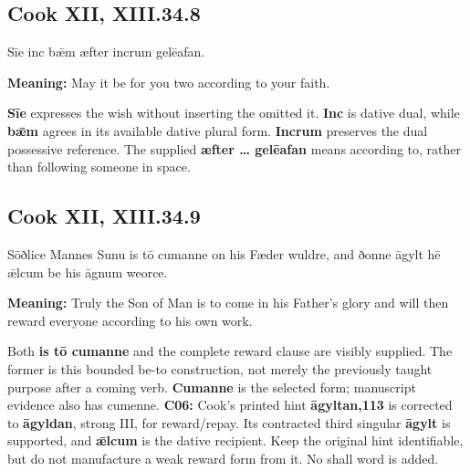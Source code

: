 \par\begin{minipage}{\linewidth}\raggedright
\subsection*{Cook XII, XIII.34.8}

Sīe inc bǣm æfter incrum gelēafan.

\textbf{Meaning:} May it be for you two according to your faith.

\textbf{Sīe} expresses the wish without inserting the omitted it. \textbf{Inc} is dative dual, while \textbf{bǣm} agrees in its available dative plural form. \textbf{Incrum} preserves the dual possessive reference. The supplied \textbf{æfter … gelēafan} means according to, rather than following someone in space.

\end{minipage}\par\addvspace{4pt}

\par\begin{minipage}{\linewidth}\raggedright
\subsection*{Cook XII, XIII.34.9}

Sōðlice Mannes Sunu is tō cumanne on his Fæder wuldre, and ðonne āgylt hē ǣlcum be his āgnum weorce.

\textbf{Meaning:} Truly the Son of Man is to come in his Father’s glory and will then reward everyone according to his own work.

Both \textbf{is tō cumanne} and the complete reward clause are visibly supplied. The former is this bounded be-to construction, not merely the previously taught purpose after a coming verb. \textbf{Cumanne} is the selected form; manuscript evidence also has cumenne. \textbf{C06:} Cook’s printed hint \textbf{āgyltan,113} is corrected to \textbf{āgyldan}, strong III, for reward/\allowbreak{}repay. Its contracted third singular \textbf{āgylt} is supported, and \textbf{ǣlcum} is the dative recipient. Keep the original hint identifiable, but do not manufacture a weak reward form from it. No shall word is added.

\end{minipage}\par\addvspace{4pt}

